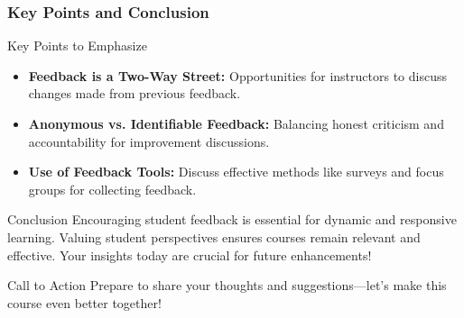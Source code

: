 \documentclass[aspectratio=169]{beamer}
\begin{document}
\begin{frame}[fragile]
    \frametitle{Key Points and Conclusion}
    \begin{block}{Key Points to Emphasize}
        \begin{itemize}
            \item \textbf{Feedback is a Two-Way Street:} Opportunities for instructors to discuss changes made from previous feedback.
            \item \textbf{Anonymous vs. Identifiable Feedback:} Balancing honest criticism and accountability for improvement discussions.
            \item \textbf{Use of Feedback Tools:} Discuss effective methods like surveys and focus groups for collecting feedback.
        \end{itemize}
    \end{block}
    
    \begin{block}{Conclusion}
        Encouraging student feedback is essential for dynamic and responsive learning. Valuing student perspectives ensures courses remain relevant and effective. Your insights today are crucial for future enhancements!
    \end{block}

    \begin{block}{Call to Action}
        Prepare to share your thoughts and suggestions—let's make this course even better together!
    \end{block}
\end{frame}
\end{document}
